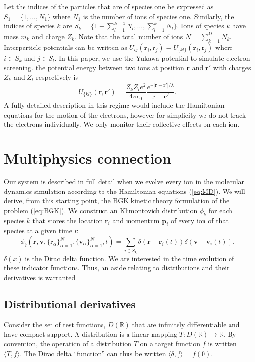 \documentclass{article}
\begin{document}
Let the indices of the particles that are of species one be expressed as $S_1=\{1,\dots, N_1\}$ where $N_1$ is the number of ions of species one. Similarly, the indices of species $k$ are $S_k=\{1+\sum_{l=1}^{k-1} N_l,\dots,\sum_{l=1}^kN_l\}$. Ions of species $k$ have mass $m_k$ and charge $Z_k$. Note that the total number of ions $N=\sum_{k=1}^\Omega N_k$. Interparticle potentials can be written as $U_{ij}(\mathbf{r}_i,\mathbf{r}_j)=U_{\{kl\}}(\mathbf{r}_i,\mathbf{r}_j)$ where $i\in S_k$ and $j\in S_l$. In this paper, we use the Yukawa potential to simulate electron screening. the potential energy between two ions at position $\mathbf{r}$ and $\mathbf{r}'$ with charges $Z_k$ and $Z_l$ respectively is
\begin{equation}U_{\{kl\}}(\mathbf{r},\mathbf{r}')=\frac{Z_kZ_le^2}{4\pi\epsilon_0}\frac{e^{-|\mathbf{r}-\mathbf{r}'|/\lambda}}{|\mathbf{r}-\mathbf{r}'|}.\label{eq:yukawa}
\end{equation}
A fully detailed description in this regime would include the Hamiltonian equations for the motion of the electrons, however for simplicity we do not track the electrons individually. We only monitor their collective effects on each ion.

\section{Multiphysics connection}
Our system is described in full detail when we evolve every ion in the molecular dynamics simulation according to the Hamiltonian equations (\ref{eq:MD}). We will derive, from this starting point, the BGK kinetic theory formulation of the problem (\ref{eq:BGK}). We construct an Klimontovich distribution \cite{klimontovich1983kinetic} $\phi_k$ for each species $k$ that stores the location $\mathbf{r}_i$ and momentum $\mathbf{p}_i$ of every ion of that species at a given time $t$:
\begin{equation}\phi_k(\mathbf{r},\mathbf{v},\{\mathbf{r}_\alpha\}_{\alpha=1}^{N},\{\mathbf{v}_\alpha\}_{\alpha=1}^{N},t)=\sum_{i\in S_k}\delta\left(\mathbf{r}-\mathbf{r}_i(t)\right)\delta\left(\mathbf{v}-\mathbf{v}_i(t)\right).
\end{equation}$\delta(x)$ is the Dirac delta function. We are interested in the time evolution of these indicator functions. Thus, an aside relating to distributions and their derivatives is warranted

\subsection{Distributional derivatives}
Consider the set of test functions, $D(\mathbb{R})$ that are infinitely differentiable and have compact support. A distribution is a linear mapping $T: D(\mathbb{R})\to\mathbb{R}$. By convention, the operation of a distribution $T$ on a target function $f$ is written $\langle T,f\rangle$. The Dirac delta ``function'' can thus be written $\langle \delta,f\rangle=f(0)$.
\end{document}
